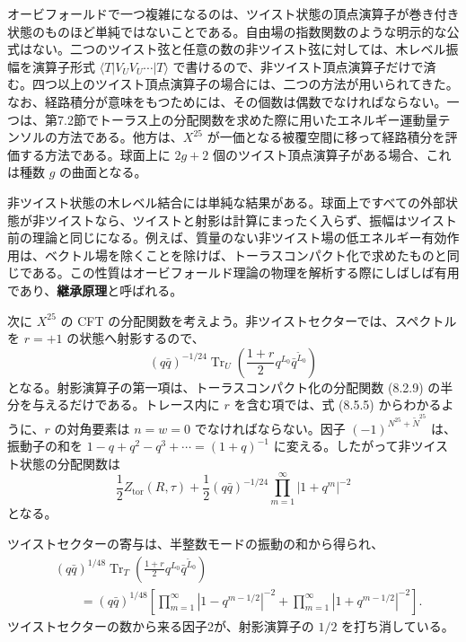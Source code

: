 オービフォールドで一つ複雑になるのは、ツイスト状態の頂点演算子が巻き付き状態のものほど単純ではないことである。自由場の指数関数のような明示的な公式はない。二つのツイスト弦と任意の数の非ツイスト弦に対しては、木レベル振幅を演算子形式 $\langle T|V_UV_U\cdots|T\rangle$ で書けるので、非ツイスト頂点演算子だけで済む。四つ以上のツイスト頂点演算子の場合には、二つの方法が用いられてきた。なお、経路積分が意味をもつためには、その個数は偶数でなければならない。一つは、第7.2節でトーラス上の分配関数を求めた際に用いたエネルギー運動量テンソルの方法である。他方は、$X^{25}$ が一価となる被覆空間に移って経路積分を評価する方法である。球面上に $2g+2$ 個のツイスト頂点演算子がある場合、これは種数 $g$ の曲面となる。

非ツイスト状態の木レベル結合には単純な結果がある。球面上ですべての外部状態が非ツイストなら、ツイストと射影は計算にまったく入らず、振幅はツイスト前の理論と同じになる。例えば、質量のない非ツイスト場の低エネルギー有効作用は、ベクトル場を除くことを除けば、トーラスコンパクト化で求めたものと同じである。この性質はオービフォールド理論の物理を解析する際にしばしば有用であり、\textbf{継承原理}と呼ばれる。

次に $X^{25}$ の CFT の分配関数を考えよう。非ツイストセクターでは、スペクトルを $r=+1$ の状態へ射影するので、
\begin{equation}
(q\bar q)^{-1/24}\operatorname{Tr}_U
\left(\frac{1+r}{2}q^{L_0}\bar q^{\widetilde L_0}\right)
\tag{8.5.9}\label{eq:8.5.9}
\end{equation}
となる。射影演算子の第一項は、トーラスコンパクト化の分配関数 (8.2.9) の半分を与えるだけである。トレース内に $r$ を含む項では、式 (8.5.5) からわかるように、$r$ の対角要素は $n=w=0$ でなければならない。因子 $(-1)^{N^{25}+\widetilde N^{25}}$ は、振動子の和を $1-q+q^2-q^3+\cdots=(1+q)^{-1}$ に変える。したがって非ツイスト状態の分配関数は
\begin{equation}
\frac12Z_{\mathrm{tor}}(R,\tau)
+\frac12(q\bar q)^{-1/24}\prod_{m=1}^{\infty}|1+q^m|^{-2}
\tag{8.5.10}\label{eq:8.5.10}
\end{equation}
となる。

ツイストセクターの寄与は、半整数モードの振動の和から得られ、
\begin{equation}
\begin{split}
&(q\bar q)^{1/48}\operatorname{Tr}_T
\left(\frac{1+r}{2}q^{L_0}\bar q^{\widetilde L_0}\right)\\
&\qquad=(q\bar q)^{1/48}
\left[\prod_{m=1}^{\infty}|1-q^{m-1/2}|^{-2}
+\prod_{m=1}^{\infty}|1+q^{m-1/2}|^{-2}\right].
\end{split}
\tag{8.5.11}\label{eq:8.5.11}
\end{equation}
ツイストセクターの数から来る因子2が、射影演算子の $1/2$ を打ち消している。

